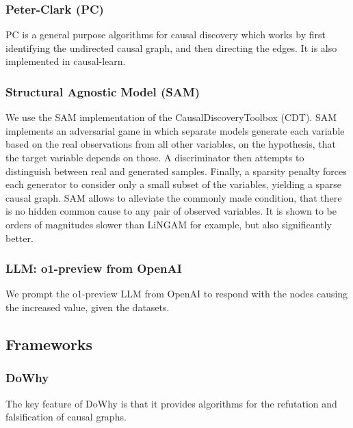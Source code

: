 \documentclass{article}
\begin{document}

    \subsubsection{Peter-Clark (PC)}
    PC \cite{PC} is a general purpose algorithms for causal discovery which works by first identifying the undirected causal graph, and then directing the edges. It is also implemented in causal-learn.
    
    \subsubsection{Structural Agnostic Model (SAM)}
    We use the SAM\cite{SAM} implementation of the CausalDiscoveryToolbox (CDT). SAM implements an adversarial game in which separate models generate each variable based on the real observations from all other variables, on the hypothesis, that the target variable depends on those. A discriminator then attempts to distinguish between real and generated samples. Finally, a sparsity penalty forces each generator to consider only a small subset of the variables, yielding a sparse causal graph. SAM allows to alleviate the commonly made condition, that there is no hidden common cause to any pair of observed variables.
    It is shown to be orders of magnitudes slower than LiNGAM for example, but also significantly better.

    \subsubsection{LLM: o1-preview from OpenAI}
    We prompt the o1-preview LLM from OpenAI to respond with the nodes causing the increased value, given the datasets.
    
    \subsection{Frameworks}
    \subsubsection{DoWhy}
    The key feature of DoWhy \cite{DoWhy} \cite{sharma2020dowhyendtoendlibrarycausal} is that it provides algorithms for the refutation and falsification of causal graphs.
    
\end{document}
